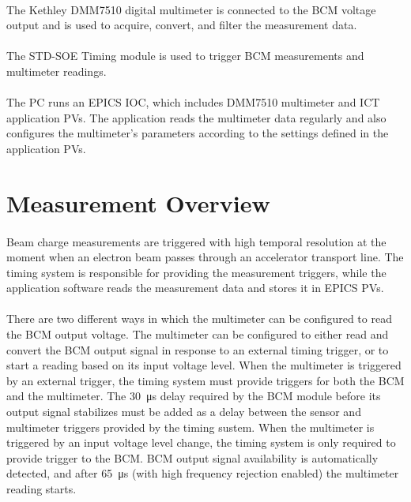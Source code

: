 \documentclass[openany]{article}
\begin{document}
	\paragraph{} The Kethley DMM7510 digital multimeter is connected to the BCM voltage output and is used to acquire, convert, and filter the measurement data.

	\paragraph{} The STD-SOE Timing module is used to trigger BCM measurements and multimeter readings.

	\paragraph{} The PC runs an EPICS IOC, which includes DMM7510 multimeter and ICT application PVs. The application reads the multimeter data regularly and also configures the multimeter's parameters according to the settings defined in the application PVs.

\section{Measurement Overview}

	\paragraph{} Beam charge measurements are triggered with high temporal resolution at the moment when an electron beam passes through an accelerator transport line. The timing system is responsible for providing the measurement triggers, while the application software reads the measurement data and stores it in EPICS PVs.
	\paragraph{} There are two different ways in which the multimeter can be configured to read the BCM output voltage. The multimeter can be configured to either read and convert the BCM output signal in response to an external timing trigger, or to start a reading based on its input voltage level. When the multimeter is triggered by an external trigger, the timing system must provide triggers for both the BCM and the multimeter. The \SI{30}{\micro\second} delay required by the BCM module before its output signal stabilizes must be added as a delay between the sensor and multimeter triggers provided by the timing sustem. When the multimeter is triggered by an input voltage level change, the timing system is only required to provide trigger to the BCM. BCM output signal availability is automatically detected, and after \SI{65}{\micro\second} (with high frequency rejection enabled) the multimeter reading starts.
\end{document}
